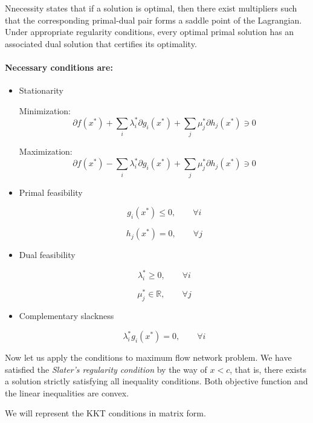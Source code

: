 \documentclass[12pt, openany]{article}
\begin{document}
Nnecessity states that if a solution is optimal, then there exist multipliers such that the corresponding primal-dual pair forms a saddle point of the Lagrangian. Under appropriate regularity conditions, every optimal primal solution has an associated dual solution that certifies its optimality.

\paragraph{Necessary conditions are:}
\begin{itemize}
\item Stationarity

Minimization:
\[
\partial f(x^*)+\sum_i \lambda_i^*\partial g_i(x^*)+\sum_j \mu_j^*\partial h_j(x^*) \ni 0
\]

Maximization:
\[
\partial f(x^*)-\sum_i \lambda_i^*\partial g_i(x^*)+\sum_j \mu_j^*\partial h_j(x^*) \ni 0
\]

\item Primal feasibility

\[
g_i(x^*)\le 0,\qquad \forall i
\]

\[
h_j(x^*)=0,\qquad \forall j
\]

\item Dual feasibility

\[
\lambda_i^*\ge 0,\qquad \forall i
\]

\[
\mu_j^* \in \mathbb{R},\qquad \forall j
\]

\item Complementary slackness

\[
\lambda_i^* g_i(x^*)=0,\qquad \forall i
\]
\end{itemize}

Now let us apply the conditions to maximum flow network problem. We have satisfied the \textit{Slater's regularity condition} by the way of \(x <  c\), that is, there exists a solution strictly satisfying all inequality conditions. Both objective function and the linear inequalities are convex.

We will represent the KKT conditions in matrix form.
\end{document}
